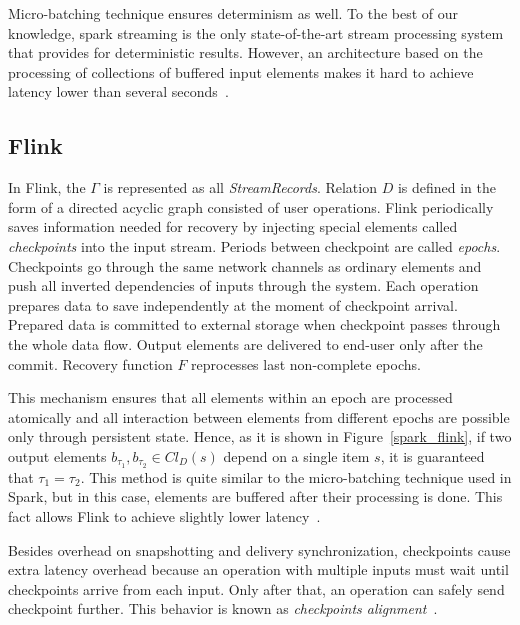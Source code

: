 Micro-batching technique ensures determinism as well. To the best of our knowledge, spark streaming is the only state-of-the-art stream processing system that provides for deterministic results. However, an architecture based on the processing of collections of buffered input elements makes it hard to achieve latency lower than several seconds~\cite{7530084, 7474816}. 

\subsection{Flink}

In Flink, the  $\Gamma$ is represented as all {\em StreamRecords}. Relation $D$ is defined in the form of a directed acyclic graph consisted of user operations. Flink periodically saves information needed for recovery by injecting special elements called {\em checkpoints} into the input stream. Periods between checkpoint are called {\em epochs}. Checkpoints go through the same network channels as ordinary elements and push all inverted dependencies of inputs through the system. Each operation prepares data to save independently at the moment of checkpoint arrival. Prepared data is committed to external storage when checkpoint passes through the whole data flow. Output elements are delivered to end-user only after the commit. Recovery function $F$ reprocesses last non-complete epochs.

This mechanism ensures that all elements within an epoch are processed atomically and all interaction between elements from different epochs are possible only through persistent state. Hence, as it is shown in Figure~\ref{spark_flink}, if two output elements $b_{\tau_1},b_{\tau_2} \in Cl_D(s)$ depend on a single item $s$, it is guaranteed that $\tau_1=\tau_2$. This method is quite similar to the micro-batching technique used in Spark, but in this case, elements are buffered after their processing is done. This fact allows Flink to achieve slightly lower latency~\cite{we2018beyondmr}.

Besides overhead on snapshotting and delivery synchronization, checkpoints cause extra latency overhead because an operation with multiple inputs must wait until checkpoints arrive from each input. Only after that, an operation can safely send checkpoint further. This behavior is known as {\em checkpoints alignment}~\cite{Carbone:2017:SMA:3137765.3137777}.
